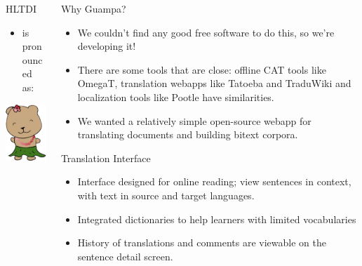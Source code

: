 \documentclass[final]{beamer}
\begin{document}
\begin{frame}{}
\begin{columns}[t]
\begin{column}{.32\linewidth}
  \begin{block}{\large HLTDI}
      \begin{itemize}
      \item is pronounced as:
      \end{itemize}
  \end{block}
  \begin{center}
    \includegraphics[width=.30\linewidth]{hltdi-logo-small.png}
  \end{center}


  \end{column}

  \begin{column}{.32\linewidth}

  \begin{block}{\large Why Guampa?}
    \begin{itemize}
    \item We couldn't find any good free software to do this, so we're
    developing it!
    \item There are some tools that are close: offline CAT tools like OmegaT,
    translation webapps like Tatoeba and TraduWiki and localization tools like
    Pootle have similarities.
    \item We wanted a relatively simple open-source webapp for translating
    documents and building bitext corpora.
    \end{itemize}
  \end{block}


  \begin{block}{\large Translation Interface}
    \centering
    \begin{itemize}
    \item Interface designed for online reading; view sentences in context,
    with text in source and target languages.
    \item Integrated dictionaries to help learners with limited vocabularies
    \item History of translations and comments are viewable on the sentence
    detail screen.
    \end{itemize}
  \end{block}


\end{column}
\end{columns}
\end{frame}
\end{document}
